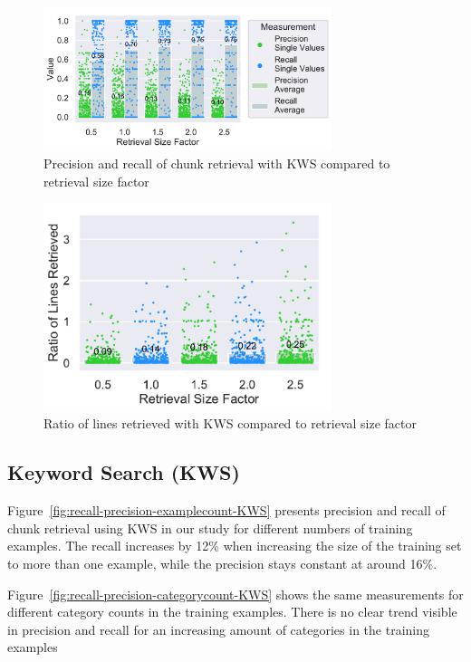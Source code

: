 \documentclass[\myrootdir/main.tex]{subfiles}
\begin{document}
\begin{figure}[htbp]
		\centering
		\includegraphics[width=0.75\textwidth, clip]{img/big-study/contextsizefactor-precision-recall-KWS.pdf}
		\caption{Precision and recall of chunk retrieval with KWS compared to retrieval size factor}
		\label{fig:contextsizefactor-precision-recall-KWS}
\end{figure}


\begin{figure}[htbp]
		\centering
		\includegraphics[width=0.75\textwidth, clip]{img/big-study/retrievalsizefactor-retrievalratio-KWS.pdf}
		\caption{Ratio of lines retrieved with KWS compared to retrieval size factor}
		\label{fig:retrievalsizefactor-retrievalratio-KWS}
\end{figure}

\subsection{Keyword Search (KWS)}
Figure~\ref{fig:recall-precision-examplecount-KWS} presents precision and recall of chunk retrieval using KWS in our study for different numbers of training examples.
The recall increases by 12\% when increasing the size of the training set to more than one example, while the precision stays constant at around 16\%.

Figure~\ref{fig:recall-precision-categorycount-KWS} shows the same measurements for different category counts in the training examples.
There is no clear trend visible in precision and recall for an increasing amount of categories in the training examples
\end{document}
